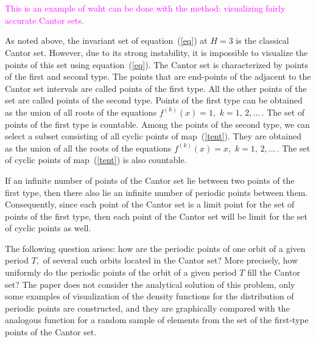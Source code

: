 \documentclass[12pt,a4paper]{amsart}
\begin{document}
\section{}

\textcolor{magenta}{This is an example of waht can be done with the method: visualizing fairly accurate Cantor sets.}

As noted above, the invariant set of equation~(\ref{eq}) at $H=3$ is the classical Cantor set. However, due to its strong instability, it is impossible to visualize 
the points of this set using equation~(\ref{eq}). The Cantor set is characterized by points of the first and second type. The points that are end-points of the adjacent 
to the Cantor set intervals are called points of the first type. All the other points of the set are called points of the second type. Points of the first type can be obtained 
as the union of all roots of the equations $f^{(k)}(x) = 1,$ $k=1,\,2,\ldots\,$. The set of points of the first type is countable. Among the points of the second type, we can select
a subset consisting of all cyclic points of map~(\ref{tent}). They are obtained as the union of all the roots of the equations $f^{(k)}(x) = x,$ $k=1,\,2,\ldots\,$. 
The set of cyclic points of map~(\ref{tent}) is also countable.

If an infinite number of points of the Cantor set lie between two points of the first type, then there also lie an infinite number of periodic points between them. 
Consequently, since each point of the Cantor set is a limit point for the set of points of the first type, then each point of the Cantor set will be limit for the set 
of cyclic points as well.

The following question arises: how are the periodic points of one orbit of a given period $T,$ of several such orbits located in the Cantor set? More precisely, how uniformly 
do the periodic points of the orbit of a given period $T$ fill the Cantor set? The paper does not consider the analytical solution of this problem, 
only some examples of visualization of the density functions for the distribution of periodic points are constructed, and they are graphically compared with 
the analogous function for a random sample of elements from the set of the first-type points of the Cantor set.
\end{document}
